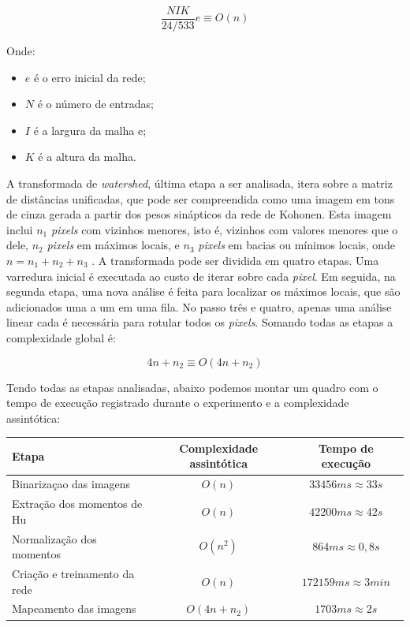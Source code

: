 \begin{equation}\label{eq:kohonen_trei}
\frac{NIK}{24/533}e \equiv O(n)
\end{equation}

Onde:

\begin{itemize}
\item $ e $ é o erro inicial da rede;
\item $ N $ é o número de entradas;
\item $ I $ é a largura da malha e;
\item $ K $ é a altura da malha.
\end{itemize}

A transformada de \textit{watershed}, última etapa a ser analisada, itera sobre a matriz
de distâncias unificadas, que pode ser compreendida como uma imagem em tons de
cinza gerada a partir dos pesos sinápticos da rede de Kohonen. Esta imagem
inclui $ n_1 $ \textit{pixels} com vizinhos menores, isto é, vizinhos com valores menores que
o dele, $ n_2 $ \textit{pixels} em máximos locais, e $ n_3 $ \textit{pixels} em bacias
ou mínimos locais,
onde $ n = n_1 + n_2 + n_3 $ \cite{Afastwatershed}. A transformada pode ser dividida em quatro etapas. Uma
varredura inicial é executada ao custo de iterar sobre cada \textit{pixel}. Em seguida,
na segunda etapa, uma nova análise é feita para localizar os máximos locais,
que são adicionados uma a um em uma fila. No passo três e quatro, apenas uma análise
linear cada é necessária para rotular todos os \textit{pixels}. Somando todas as etapas
a complexidade global é:

\begin{equation}\label{eq:watershed_val}
4n + n_2 \equiv O(4n + n_2)
\end{equation}

Tendo todas as etapas analisadas, abaixo podemos montar um quadro com o tempo
de execução registrado durante o experimento e a complexidade assintótica:

\begin{center}
  \begin{tabular}{|l|c|c|}
    \hline\hline
    \textbf{Etapa} & \textbf{Complexidade assintótica} & \textbf{Tempo de execução} \\
    \hline\hline
    Binarizaçao das imagens & $ O(n) $ & $ 33456ms \approx 33s $ \\
    \hline
    Extração dos momentos de Hu & $ O(n) $ & $ 42200ms \approx 42s $ \\
    \hline
    Normalização dos momentos & $ O(n^2) $ & $ 864ms \approx 0,8s $ \\
    \hline
    Criação e treinamento da rede & $ O(n) $ & $ 172159ms \approx 3min  $ \\
    \hline
    Mapeamento das imagens & $ O(4n + n_2) $ & $ 1703ms \approx 2s $ \\
    \hline
  \end{tabular}
\end{center}
